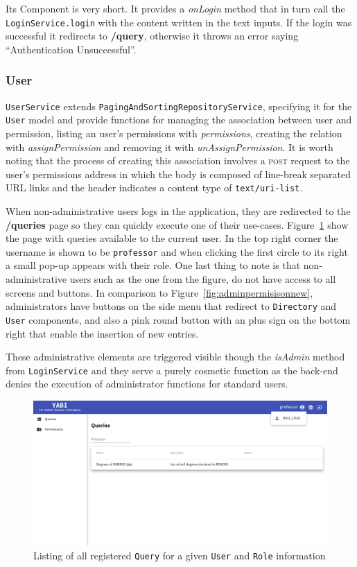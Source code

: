 Its Component is very short. It provides a \textit{onLogin} method that in turn call the \texttt{LoginService.login} with the content written in the text inputs. If the login was successful it redirects to \textbf{/query}, otherwise it throws an error saying ``Authentication Unsuccessful''.

\subsubsection{User}
\texttt{UserService} extends \texttt{PagingAndSortingRepositoryService}, specifying it for the \texttt{User} model and provide functions for managing the association between user and permission, listing an user's permissions with \textit{permissions}, creating the relation with \textit{assignPermission} and removing it with \textit{unAssignPermission}. It is worth noting that the process of creating this association involves a \textsc{post} request to the user's permissions address in which the body is composed of line-break separated \gls{URL} links and the header indicates a content type of \texttt{text/uri-list}.

When non-administrative users logs in the application, they are redirected to the \textbf{/queries} page so they can quickly execute one of their use-cases. Figure~\ref{fig:userquerylist} show the page with queries available to the current user. In the top right corner the username is shown to be \texttt{professor} and when clicking the first circle to its right a small pop-up appears with their role. One last thing to note is that non-administrative users such as the one from the figure, do not have access to all screens and buttons. In comparison to Figure~\ref{fig:adminpermisisonnew}, administrators have buttons on the side menu that redirect to \texttt{Directory} and \texttt{User} components, and also a pink round button with an plus sign on the bottom right that enable the insertion of new entries.

These administrative elements are triggered visible though the \textit{isAdmin} method from \texttt{LoginService} and they serve a purely cosmetic function as the back-end denies the execution of administrator functions for standard users.

\begin{figure}
  \centering
  \includegraphics[width=.8\textwidth]{images/screenshots/user/user-query-listing-and-role}
  \caption{Listing of all registered \texttt{Query} for a given \texttt{User} and \texttt{Role} information}\label{fig:userquerylist}
\end{figure}

